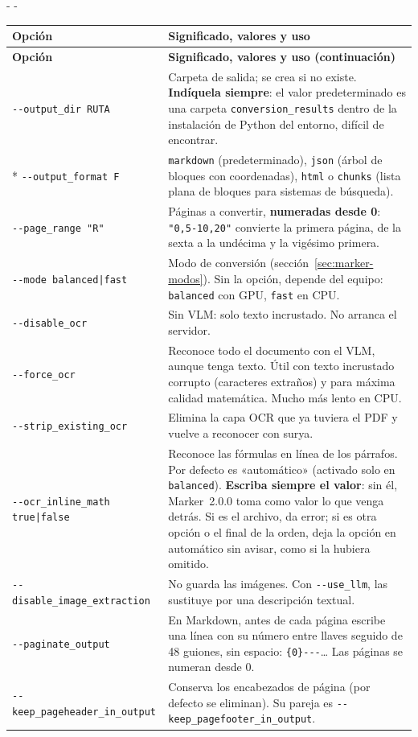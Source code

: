 \documentclass[11pt,a4paper]{article}
\makeatletter
\newcommand{\necesitaespacio}[1]{\par\penalty-100\begingroup
	\setlength{\dimen@}{#1}\dimen@ii\pagegoal\advance\dimen@ii-\pagetotal
	\ifdim\dimen@>\dimen@ii\ifdim\dimen@ii>\z@\vfil\fi\penalty-\@M\fi\endgroup}
\newenvironment{opciones}[1][Opción]{%
	\par\begingroup\small
	\begin{longtable}{L{4.25cm}L{11.2cm}}
		\toprule\rowcolor{tablacab}\cab{#1} & \cab{Significado, valores y uso} \\ \midrule
		\endfirsthead
		\toprule\rowcolor{tablacab}\cab{#1} & \cab{Significado, valores y uso (continuación)} \\ \midrule
		\endhead
		\bottomrule
		\endfoot}
	{\end{longtable}\endgroup}
\newcommand{\opt}[1]{\texttt{\textcolor{colopt}{#1}}}      %
\newcommand{\arch}[1]{\texttt{\textcolor{colarch}{#1}}}    %
\newcommand{\val}[1]{\texttt{#1}}                          %
\newcommand{\cab}[1]{\textbf{#1}}
\makeatother
\begin{document}
	\necesitaespacio{10\baselineskip}
	\begin{opciones}
		\opt{-{}-output\_\allowbreak{}dir RUTA} & Carpeta de salida; se crea si no existe. \textbf{Indíquela siempre}: el valor predeterminado es una carpeta \arch{conversion\_\allowbreak{}results} dentro de la instalación de Python del entorno, difícil de encontrar.\\*
		\opt{-{}-output\_\allowbreak{}format F} & \val{markdown} (predeterminado), \val{json} (árbol de bloques con coordenadas), \val{html} o \val{chunks} (lista plana de bloques para sistemas de búsqueda).\\
		\opt{-{}-page\_\allowbreak{}range "R"} & Páginas a convertir, \textbf{numeradas desde 0}: \val{"0,5-10,20"} convierte la primera página, de la sexta a la undécima y la vigésimo primera.\\
		\opt{-{}-mode balanced|\allowbreak{}fast} & Modo de conversión (sección~\ref{sec:marker-modos}). Sin la opción, depende del equipo: \val{balanced} con GPU, \val{fast} en CPU.\\
		\opt{-{}-disable\_ocr} & Sin VLM: solo texto incrustado. No arranca el servidor.\\
		\opt{-{}-force\_ocr} & Reconoce todo el documento con el VLM, aunque tenga texto. Útil con texto incrustado corrupto (caracteres extraños) y para máxima calidad matemática. Mucho más lento en CPU.\\
		\opt{-{}-strip\_\allowbreak{}existing\_\allowbreak{}ocr} & Elimina la capa OCR que ya tuviera el PDF y vuelve a reconocer con surya.\\
		\opt{-{}-ocr\_\allowbreak{}inline\_\allowbreak{}math true|\allowbreak{}false} & Reconoce las fórmulas en línea de los párrafos. Por defecto es «automático» (activado solo en \val{balanced}). \textbf{Escriba siempre el valor}: sin él, Marker~2.0.0 toma como valor lo que venga detrás. Si es el archivo, da error; si es otra opción o el final de la orden, deja la opción en automático sin avisar, como si la hubiera omitido.\\
		\opt{-{}-disable\_\allowbreak{}image\_\allowbreak{}extraction} & No guarda las imágenes. Con \opt{-{}-use\_llm}, las sustituye por una descripción textual.\\
		\opt{-{}-paginate\_\allowbreak{}output} & En Markdown, antes de cada página escribe una línea con su número entre llaves seguido de 48 guiones, sin espacio: \texttt{\{0\}-{}-{}-}\ldots{} Las páginas se numeran desde 0.\\
		\opt{-{}-keep\_\allowbreak{}pageheader\_\allowbreak{}in\_\allowbreak{}output} & Conserva los encabezados de página (por defecto se eliminan). Su pareja es \opt{-{}-keep\_\allowbreak{}pagefooter\_\allowbreak{}in\_\allowbreak{}output}.\\

\end{opciones}
\end{document}
